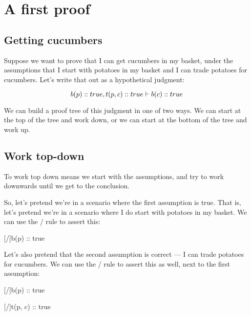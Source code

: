 \documentclass[../../../main.tex]{subfiles}
\begin{document}
\chapter{A first proof}


\section{Getting cucumbers}

Suppose we want to prove that I can get cucumbers in my basket, under the assumptions that I start with potatoes in my basket and I can trade potatoes for cucumbers. Let's write that out as a hypothetical judgment:

\begin{equation*}
  b(p) :: true, t(p, c) :: true \ndturnstile/ b(c) :: true
\end{equation*}

\noindent
We can build a proof tree of this judgment in one of two ways. We can start at the top of the tree and work down, or we can start at the bottom of the tree and work up.


\section{Work top-down}

To work top down means we start with the assumptions, and try to work downwards until we get to the conclusion.

So, let's pretend we're in a scenario where the first assumption is true. That is, let's pretend we're in a scenario where I do start with potatoes in my basket. We can use the \startrule/ rule to assert this:

\begin{prooftree*}
  \hypo{}
  [\startrule/]{b(p) :: true}
\end{prooftree*}

\noindent
Let's also pretend that the second assumption is correct --- I can trade potatoes for cucumbers. We can use the \startrule/ rule to assert this as well, next to the first assumption:

\begin{prooftree*}
  \hypo{}
  [\startrule/]{b(p) :: true}
  
  \hypo{}
  [\startrule/]{t(p, c) :: true}
  
\end{prooftree*}
\end{document}
